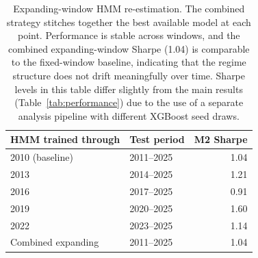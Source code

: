 \begin{table}[H]
\centering
\small
\begin{tabular}{l l r}
\toprule
HMM trained through & Test period & M2 Sharpe \\
\midrule
2010 (baseline) & 2011--2025 & 1.04 \\
2013 & 2014--2025 & 1.21 \\
2016 & 2017--2025 & 0.91 \\
2019 & 2020--2025 & 1.60 \\
2022 & 2023--2025 & 1.14 \\
\midrule
Combined expanding & 2011--2025 & 1.04 \\
\bottomrule
\end{tabular}
\caption{Expanding-window HMM re-estimation. The combined strategy stitches together the best available model at each point. Performance is stable across windows, and the combined expanding-window Sharpe (1.04) is comparable to the fixed-window baseline, indicating that the regime structure does not drift meaningfully over time. Sharpe levels in this table differ slightly from the main results (Table~\ref{tab:performance}) due to the use of a separate analysis pipeline with different XGBoost seed draws.}
\label{tab:expanding}
\end{table}